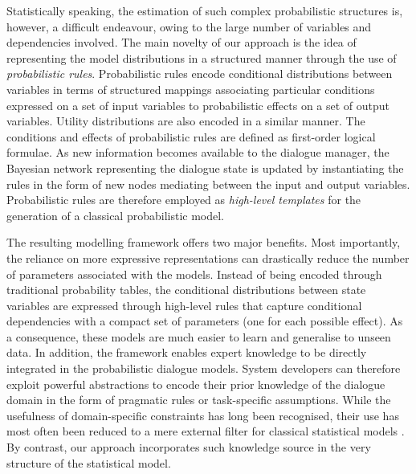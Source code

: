 Statistically speaking, the estimation of such complex probabilistic structures is, however, a difficult endeavour, owing to the large number of variables and dependencies involved. The main novelty of our approach is the idea of representing the model distributions in a structured manner through the use of \textit{probabilistic rules}.  Probabilistic rules encode conditional distributions between variables in terms of structured mappings associating particular conditions expressed on a set of input variables to probabilistic effects on a set of output variables.  Utility distributions are also encoded in a similar manner. The conditions and effects of probabilistic rules are defined as first-order logical formulae. As new information becomes available to the dialogue manager, the Bayesian network representing the dialogue state is updated by instantiating the rules in the form of new nodes mediating between the input and output variables. Probabilistic rules are therefore employed as \textit{high-level templates} for the generation of a classical probabilistic model.  

The resulting modelling framework offers two major benefits. Most importantly, the reliance on more expressive representations can drastically reduce the number of parameters associated with the models.  Instead of being encoded through traditional probability tables, the conditional distributions between state variables are expressed through high-level rules that capture conditional dependencies with a compact set of parameters (one for each possible effect). As a consequence, these models are much easier to learn and generalise to unseen data.  In addition, the framework enables expert knowledge to be directly integrated in the probabilistic dialogue models. System developers can therefore exploit powerful abstractions to encode their prior knowledge of the dialogue domain in the form of pragmatic rules or task-specific assumptions.    
While the usefulness of domain-specific constraints has long been recognised, their use has most often been reduced to a mere external filter for classical statistical models \citep{heeman2007,williams2008}. By contrast, our approach incorporates such knowledge source in the very structure of the statistical model. 

